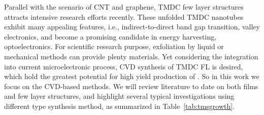 Parallel with the scenario of CNT and graphene, TMDC few layer structures attracts intensive research efforts recently. These unfolded TMDC nanotubes exhibit many appealing features, i.e., indirect-to-direct band gap transition,\cite{Splendiani2010} valley electronics, and become a promising candidate in energy harvesting, optoelectronics. For scientific research purpose, exfoliation by liquid \cite{Smith2011} or mechanical methods \cite{Lee2010a} can provide plenty materials. Yet considering the integration into current microelectronic process, CVD synthesis of TMDC FL is desired, which hold the greatest potential for high yield production of . So in this work we focus on the CVD-based methods. We will review literature to date on both  films and few layer structures, and highlight several typical investigations using different type synthesis method, as summarized in Table~\ref{tab:tmsgrowth}.

